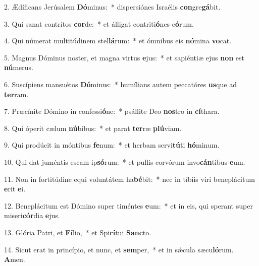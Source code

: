 2. Ædíficans Jerúsalem \textbf{Dó}minus:~*  dispersiónes Israélis \textbf{con}gre\textbf{gá}bit.\

3. Qui sanat contrítos \textbf{cor}de:~*  et álligat contriti\textbf{ó}nes e\textbf{ó}rum.\

4. Qui númerat multitúdinem stel\textbf{lá}rum:~*  et ómnibus eis \textbf{nó}mina \textbf{vo}cat.\

5. Magnus Dóminus noster, et magna virtus \textbf{e}jus:~*  et sapiéntiæ ejus \textbf{non} est \textbf{nú}merus.\

6. Suscípiens mansuétos \textbf{Dó}minus:~*  humílians autem peccatóres \textbf{us}que ad \textbf{ter}ram.\

7. Præcínite Dómino in confessi\textbf{ó}ne:~*  psállite Deo \textbf{nos}tro in \textbf{cí}thara.\

8. Qui óperit cælum \textbf{nú}bibus:~*  et parat \textbf{ter}ræ \textbf{plú}viam.\

9. Qui prodúcit in móntibus \textbf{fe}num:~*  et herbam servi\textbf{tú}ti \textbf{hó}minum.\

10. Qui dat juméntis escam ip\textbf{só}rum:~*  et pullis corvórum invo\textbf{cán}tibus \textbf{e}um.\

11. Non in fortitúdine equi voluntátem ha\textbf{bé}bit:~*  nec in tíbiis viri beneplácitum \textbf{e}rit \textbf{e}i.\

12. Beneplácitum est Dómino super timéntes \textbf{e}um:~*  et in eis, qui sperant super miseri\textbf{cór}dia \textbf{e}jus.\

13. Glória Patri, et \textbf{Fí}lio,~*  et Spi\textbf{rí}tui \textbf{Sanc}to.\

14. Sicut erat in princípio, et nunc, et \textbf{sem}per,~*  et in sǽcula sæcu\textbf{ló}rum. \textbf{A}men.\

